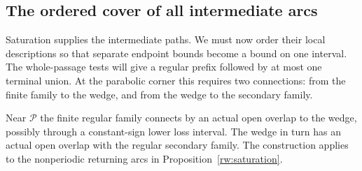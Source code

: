 \subsection{The ordered cover of all intermediate arcs}

Saturation supplies the intermediate paths. We must now order their
local descriptions so that separate endpoint bounds become a bound
on one interval. The whole-passage tests will give a regular prefix
followed by at most one terminal union. At the parabolic corner this
requires two connections: from the finite family to the wedge, and
from the wedge to the secondary family.

\begin{lemma}
\label{rw:fibre:parabolic-connections}
Near $\mathcal P$ the finite regular family connects by an actual
open overlap to the wedge, possibly through a constant-sign lower
loss interval. The wedge in turn has an actual open overlap with
the regular secondary family. The construction applies to the
nonperiodic returning arcs in Proposition~\ref{rw:saturation}.
\end{lemma}
